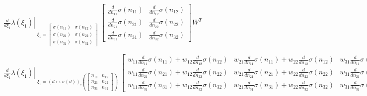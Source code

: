\documentclass[11pt]{article}
\begin{document}
    
    $\displaystyle \left. \frac{d}{d \xi_{1}} \lambda{\left(\xi_{1} \right)} \right|_{\substack{ \xi_{1}=\left[\begin{matrix}\sigma{\left(n_{11} \right)} & \sigma{\left(n_{12} \right)}\\\sigma{\left(n_{21} \right)} & \sigma{\left(n_{22} \right)}\\\sigma{\left(n_{31} \right)} & \sigma{\left(n_{32} \right)}\end{matrix}\right] }} \left[\begin{matrix}\frac{d}{d n_{11}} \sigma{\left(n_{11} \right)} & \frac{d}{d n_{12}} \sigma{\left(n_{12} \right)}\\\frac{d}{d n_{21}} \sigma{\left(n_{21} \right)} & \frac{d}{d n_{22}} \sigma{\left(n_{22} \right)}\\\frac{d}{d n_{31}} \sigma{\left(n_{31} \right)} & \frac{d}{d n_{32}} \sigma{\left(n_{32} \right)}\end{matrix}\right] W^{T}$

    
    $\displaystyle \left. \frac{d}{d \xi_{1}} \lambda{\left(\xi_{1} \right)} \right|_{\substack{ \xi_{1}={\left( d \mapsto \sigma{\left(d \right)} \right)}_{\circ}\left({\left[\begin{matrix}n_{11} & n_{12}\\n_{21} & n_{22}\\n_{31} & n_{32}\end{matrix}\right]}\right) }} \left[\begin{matrix}w_{11} \frac{d}{d n_{11}} \sigma{\left(n_{11} \right)} + w_{12} \frac{d}{d n_{12}} \sigma{\left(n_{12} \right)} & w_{21} \frac{d}{d n_{11}} \sigma{\left(n_{11} \right)} + w_{22} \frac{d}{d n_{12}} \sigma{\left(n_{12} \right)} & w_{31} \frac{d}{d n_{11}} \sigma{\left(n_{11} \right)} + w_{32} \frac{d}{d n_{12}} \sigma{\left(n_{12} \right)}\\w_{11} \frac{d}{d n_{21}} \sigma{\left(n_{21} \right)} + w_{12} \frac{d}{d n_{22}} \sigma{\left(n_{22} \right)} & w_{21} \frac{d}{d n_{21}} \sigma{\left(n_{21} \right)} + w_{22} \frac{d}{d n_{22}} \sigma{\left(n_{22} \right)} & w_{31} \frac{d}{d n_{21}} \sigma{\left(n_{21} \right)} + w_{32} \frac{d}{d n_{22}} \sigma{\left(n_{22} \right)}\\w_{11} \frac{d}{d n_{31}} \sigma{\left(n_{31} \right)} + w_{12} \frac{d}{d n_{32}} \sigma{\left(n_{32} \right)} & w_{21} \frac{d}{d n_{31}} \sigma{\left(n_{31} \right)} + w_{22} \frac{d}{d n_{32}} \sigma{\left(n_{32} \right)} & w_{31} \frac{d}{d n_{31}} \sigma{\left(n_{31} \right)} + w_{32} \frac{d}{d n_{32}} \sigma{\left(n_{32} \right)}\end{matrix}\right]$
\end{document}
